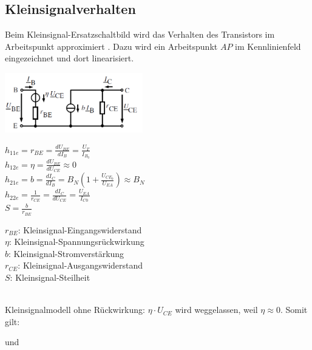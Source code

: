 	\subsection{Kleinsignalverhalten}
		Beim Kleinsignal-Ersatzschaltbild wird das Verhalten des Transistors im Arbeitspunkt
		approximiert . Dazu wird ein Arbeitspunkt $AP$ im Kennlinienfeld eingezeichnet
		und dort linearisiert. \\
		\begin{minipage}[c]{6cm}
			\includegraphics[width=6cm]{images/bip-kleinsignal}
		\end{minipage}
		\begin{minipage}[c]{6cm}
			$h_{11e} = r_{BE} = \frac{dU_{BE}}{dI_{B}} = \frac{U_T}{I_{B_0}}$ \\
			$h_{12e} = \eta = \frac{dU_{BE}}{dU_{CE}} \approx 0$ \\
			$h_{21e} = b = \frac{dI_C}{dI_B} = B_N(1+\frac{U_{CE_0}}{U_{EA}}) \approx B_N$ \\
			$h_{22e} = \frac{1}{r_{CE}} = \frac{dI_C}{dU_{CE}} = \frac{U_{EA}}{I_{C0}}$ \\
			$S = \frac{b}{r_{BE}}$
		\end{minipage}
		\begin{minipage}[c]{6cm}
			$r_{BE}$: Kleinsignal-Eingangswiderstand \\
			$\eta$: Kleinsignal-Spannungsrückwirkung \\
			$b$: Kleinsignal-Stromverstärkung \\
			$r_{CE}$: Kleinsignal-Ausgangswiderstand \\
			$S$: Kleinsignal-Steilheit
		\end{minipage} \\
		Kleinsignalmodell ohne Rückwirkung: $\eta \cdot U_{CE}$ wird weggelassen, weil 
		$\eta \approx 0$. Somit gilt: \\
		\begin{center}
			 \hspace{1cm} und \hspace{1cm}
			 \\
		\end{center}
		
